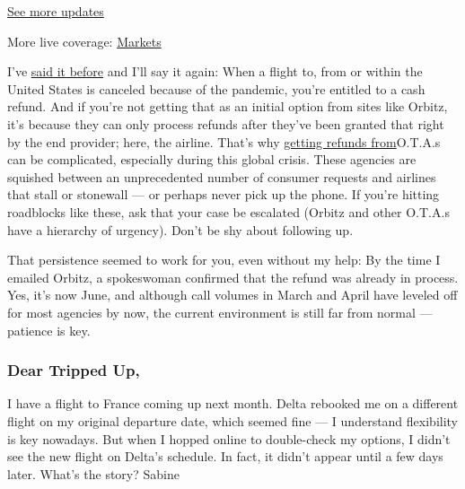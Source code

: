 \href{https://www.nytimes.com/2020/08/03/world/coronavirus-covid-19.html?action=click\&pgtype=Article\&state=default\&region=MAIN_CONTENT_1\&context=storylines_live_updates}{See
more updates}

More live coverage:
\href{https://www.nytimes.com/live/2020/08/03/business/stock-market-today-coronavirus?action=click\&pgtype=Article\&state=default\&region=MAIN_CONTENT_1\&context=storylines_live_updates}{Markets}

I've
\href{https://www.nytimes.com/2020/05/01/travel/trip-refund-airlines.html}{said
it before} and I'll say it again: When a flight to, from or within the
United States is canceled because of the pandemic, you're entitled to a
cash refund. And if you're not getting that as an initial option from
sites like Orbitz, it's because they can only process refunds after
they've been granted that right by the end provider; here, the airline.
That's why
\href{https://www.nytimes.com/2020/04/03/travel/coronavirus-refund-travel-ota.html?smtyp=cur\&smid=tw-nytimestravelhttps://www.nytimes.com/2020/04/03/travel/coronavirus-refund-travel-ota.html}{getting
refunds from}O.T.A.s can be complicated, especially during this global
crisis. These agencies are squished between an unprecedented number of
consumer requests and airlines that stall or stonewall --- or perhaps
never pick up the phone. If you're hitting roadblocks like these, ask
that your case be escalated (Orbitz and other O.T.A.s have a hierarchy
of urgency). Don't be shy about following up.

That persistence seemed to work for you, even without my help: By the
time I emailed Orbitz, a spokeswoman confirmed that the refund was
already in process. Yes, it's now June, and although call volumes in
March and April have leveled off for most agencies by now, the current
environment is still far from normal --- patience is key.

\hypertarget{dear-tripped-up-1}{%
\subsubsection{\texorpdfstring{\textbf{Dear Tripped
Up,}}{Dear Tripped Up,}}\label{dear-tripped-up-1}}

I have a flight to France coming up next month. Delta rebooked me on a
different flight on my original departure date, which seemed fine --- I
understand flexibility is key nowadays. But when I hopped online to
double-check my options, I didn't see the new flight on Delta's
schedule. In fact, it didn't appear until a few days later. What's the
story? Sabine

